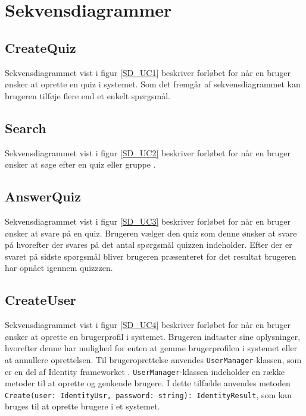 \section{Sekvensdiagrammer}

\subsection*{CreateQuiz}
Sekvensdiagrammet vist i figur \ref{SD_UC1} beskriver forløbet for når en bruger ønsker at oprette en quiz i systemet. Som det fremgår af sekvensdiagrammet kan brugeren tilføje flere end et enkelt spørgsmål.


\subsection*{Search}
Sekvensdiagrammet vist i figur \ref{SD_UC2} beskriver forløbet for når en bruger ønsker at søge efter en quiz eller gruppe .


\subsection*{AnswerQuiz}
Sekvensdiagrammet vist i figur \ref{SD_UC3} beskriver forløbet for når en bruger ønsker at svare på en quiz. Brugeren vælger den quiz som denne ønsker at svare på hvorefter der svares på det antal spørgsmål quizzen indeholder. Efter der er svaret på sidste spørgsmål bliver brugeren præsenteret for det resultat brugeren har opnået igennem quizzzen.


\subsection*{CreateUser}
Sekvensdiagrammet vist i figur \ref{SD_UC4} beskriver forløbet for når en bruger ønsker at oprette en brugerprofil i systemet. Brugeren indtaster sine oplysninger, hvorefter denne har mulighed for enten at gemme brugerprofilen i systemet eller at annullere oprettelsen. Til brugeroprettelse anvendes \verb+UserManager+-klassen, som er en del af Identity frameworket \citep{netidentityWeb}. \verb+UserManager+-klassen indeholder en række metoder til at oprette og genkende brugere. I dette tilfælde anvendes metoden \verb+Create(user: IdentityUsr, password: string): IdentityResult+, som kan bruges til at oprette brugere i et systemet.


